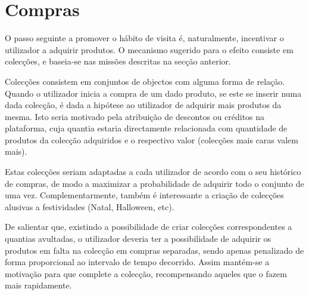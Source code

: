 \section{Compras}
O passo seguinte a promover o hábito de visita é, naturalmente, incentivar o utilizador a adquirir produtos. O mecanismo sugerido para o efeito consiste em colecções, e baseia-se nas missões descritas na secção anterior.

Colecções consistem em conjuntos de objectos com alguma forma de relação.
Quando o utilizador inicia a compra de um dado produto, se este se inserir numa dada colecção, é dada a hipótese ao utilizador de adquirir mais produtos da mesma. Isto seria motivado pela atribuição de descontos ou créditos na plataforma, cuja quantia estaria directamente relacionada com quantidade de produtos da colecção adquiridos e o respectivo valor (colecções mais caras valem mais).

Estas colecções seriam adaptadas a cada utilizador de acordo com o seu histórico de compras, de modo a maximizar a probabilidade de adquirir todo o conjunto de uma vez. Complementarmente, também é interessante a criação de colecções alusivas a festividades (Natal, Halloween, etc).

De salientar que, existindo a possibilidade de criar colecções correspondentes a quantias avultadas, o utilizador deveria ter a possibilidade de adquirir os produtos em falta na colecção em compras separadas, sendo apenas penalizado de forma proporcional ao intervalo de tempo decorrido. Assim mantém-se a motivação para que complete a colecção, recompensando aqueles que o fazem mais rapidamente.